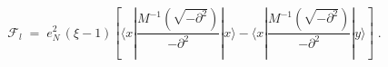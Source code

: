 \begin{equation}\label{eq:g3}
 {\mathcal F}_l\;=\;e_N^2 \,(\xi - 1) \left[ 
\langle x| {\frac{M^{-1}(\sqrt{-\partial^2}) }{-\partial^2}} |x\rangle  
-  \langle x| {\frac{M^{-1}(\sqrt{-\partial^2}) }{-\partial^2}} |y\rangle \right]\;.
\end{equation}

